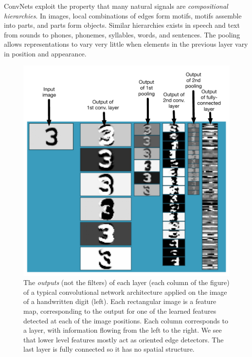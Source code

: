 \documentclass[10pts]{article}
\begin{document}
ConvNets exploit the property that many natural
signals are {\em compositional hierarchies}. In images, local
combinations of edges form motifs, motifs assemble into parts, and
parts form objects.  Similar hierarchies
exists in speech and text from sounds to phones, phonemes, syllables,
words, and sentences. The pooling allows representations to vary very little
when elements in the previous layer vary in position and appearance. 

\begin{figure}[b]
\vspace{-4mm}
\begin{center}
  \includegraphics[width=0.70\linewidth]{convnet-diagram-labeled}
\end{center}
\vspace{-3mm}
\caption{The {\em outputs} (not the filters) of each layer (each column of the figure) 
of a typical convolutional network architecture
applied on the image of a handwritten digit (left). Each rectangular
image is a feature map, corresponding to the output for one of the learned features 
detected at each of the image positions.
Each column corresponds to a layer, with information flowing from the left to
the right. We see that lower level features mostly act as oriented edge detectors.
The last layer is fully connected so it has no spatial structure.
}
\vspace{-2mm}
\label{fig:convnet}
\end{figure}
\end{document}
